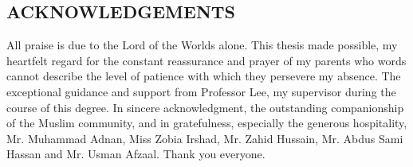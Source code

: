 \begin{center}
\section*{ACKNOWLEDGEMENTS}
\end{center}
\thispagestyle{empty}

All praise is due to the Lord of the Worlds alone. This thesis made possible, my heartfelt regard for the constant reassurance and prayer of my parents who words cannot describe the level of patience with which they persevere my absence. The exceptional guidance and support from Professor Lee, my supervisor during the course of this degree. In sincere acknowledgment, the outstanding companionship of the Muslim community, and in gratefulness, especially the generous hospitality, Mr. Muhammad Adnan, Miss Zobia Irshad, Mr. Zahid Hussain, Mr. Abdus Sami Hassan and Mr. Usman Afzaal. Thank you everyone.


\pagebreak
